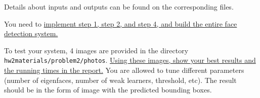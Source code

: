 Details about inputs and outputs can be found on the corresponding files.


You need to \ul{implement step 1, step 2, and step 4, and build the entire face detection system.} 

To test your system, 4 images are provided in the directory \texttt{hw2materials/problem2/photos}. \ul{Using these images, show your best results and the running times in the report.} You are allowed to tune different parameters (number of eigenfaces, number of weak learners, threshold, etc). The result should be in the form of image with the predicted bounding boxes.

\fi
